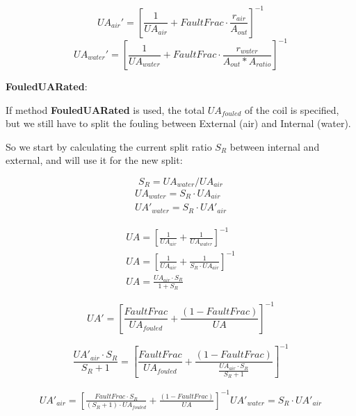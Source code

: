 \begin{equation}
    UA_{air}' = [\frac{1}{UA_{air}} + FaultFrac \cdot \frac{r_{air}}{A_{out}}]^{-1}
\end{equation}
\begin{equation}
    UA_{water}' = [\frac{1}{UA_{water}} + FaultFrac \cdot \frac{r_{water}}{A_{out}*A_{ratio}}]^{-1}
\end{equation}

\textbf{FouledUARated}:

If method \textbf{FouledUARated} is used, the total $UA_{fouled}$ of the coil is specified, but we still have to split the fouling between External (air) and Internal (water).

So we start by calculating the current split ratio $S_R$ between internal and external, and will use it for the new split:

\begin{equation}
    S_R = UA_{water} / UA_{air}
\end{equation}
\begin{equation}
\begin{array}{l}
    UA_{water} = S_R \cdot UA_{air} \\
    UA'_{water} = S_R \cdot UA'_{air}
\end{array}
\end{equation}

\begin{equation}
\begin{array}{l}
    UA = [\frac{1}{UA_{air}} + \frac{1}{UA_{water}}]^{-1} \\
    UA = [\frac{1}{UA_{air}} + \frac{1}{S_R \cdot UA_{air}}]^{-1} \\
    UA = \frac{UA_{air} \cdot S_R}{1 + S_R}
\end{array}
\end{equation}

\begin{equation}
    UA' = [\frac{FaultFrac}{UA_{fouled}}+\frac{(1-FaultFrac)}{UA}]^{-1}
\end{equation}


\begin{equation}
    \frac{UA'_{air} \cdot S_R}{S_R + 1} = [\frac{FaultFrac}{UA_{fouled}}+\frac{(1-FaultFrac)}{\frac{UA_{air} \cdot S_R}{S_R + 1}}]^{-1}
\end{equation}

\begin{equation}
\begin{array}{l}
    UA'_{air} = [\frac{FaultFrac \cdot S_R}{(S_R+1) \cdot UA_{fouled}}+\frac{(1-FaultFrac)}{UA}]^{-1}
    UA'_{water} = S_R \cdot UA'_{air}
\end{array}
\end{equation}


